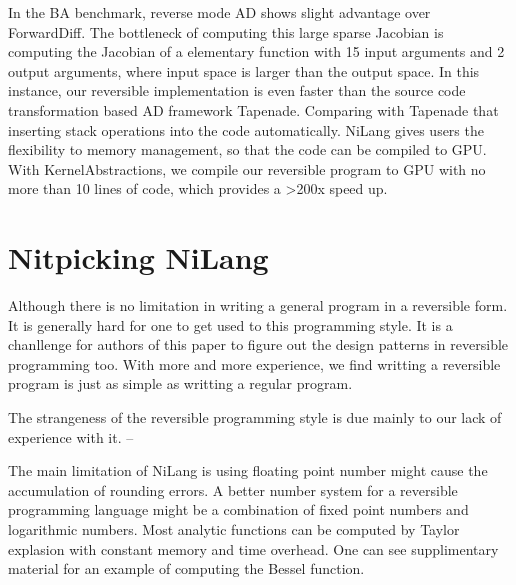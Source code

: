 \documentclass{article}
\newcommand{\<}{\langle}
\renewcommand{\>}{\rangle}
\theoremstyle{definition}\newtheorem{definition}{\textit{Definition}}
\begin{document}
In the BA benchmark, reverse mode AD shows slight advantage over ForwardDiff.
The bottleneck of computing this large sparse Jacobian is computing the Jacobian of a elementary function with 15 input arguments and 2 output arguments, where input space is larger than the output space.
In this instance, our reversible implementation is even faster than the source code transformation based AD framework Tapenade.
Comparing with Tapenade that inserting stack operations into the code automatically. NiLang gives users the flexibility to memory management, so that the code can be compiled to GPU.
With KernelAbstractions, we compile our reversible program to GPU with no more than 10 lines of code, which provides a >200x speed up.


\section{Nitpicking NiLang}
Although there is no limitation in writing a general program in a reversible form. It is generally hard for one to get used to this programming style.
It is a chanllenge for authors of this paper to figure out the design patterns in reversible programming too.
With more and more experience, we find writting a reversible program is just as simple as writting a regular program.
\begin{quoting}
The strangeness of the reversible programming style is due mainly to our lack of experience with it. -- ~\cite{Baker1992}
\end{quoting}
The main limitation of NiLang is using floating point number might cause the accumulation of rounding errors.
A better number system for a reversible programming language might be a combination of fixed point numbers and logarithmic numbers.
Most analytic functions can be computed by Taylor explasion with constant memory and time overhead. One can see supplimentary material for an example of computing the Bessel function.
\end{document}
